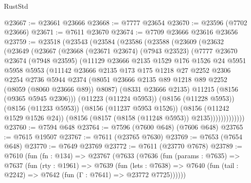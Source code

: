 \begin{lexlean}{RustStd}
\begin{coremodule}
@23667 := @23661 @23666
@23668 := @7777 @23654
@23670 := @23596 (@7702 @23666)
@23671 := @7611 @23670
@23674 := @7709 @23666 @23616 @23656
@23759 := @23518
    (@23543
      (@23584
        (@23586
          (@23588
            (@23609
              (@23632
                (@23649
                  (@23667
                    (@23668
                      (@23671 @23674)
                      (@7943 @23523)
                      (@7777
                        @23670
                        @23674
                        (@7948 @23595)
                        (@11129
                          @23666
                          @2135
                          @1529
                          @176
                          @1526
                          @24
                          @5951
                          @5958
                          @5953
                          (@11142
                            @23666
                            @2135
                            @173
                            @175
                            @1218
                            @27
                            @2252
                            @2306
                            @2254
                            @2736
                            @5944
                            @2374
                            (@8051
                              @23666
                              @2135
                              @89
                              @1218
                              @89
                              @2252
                              (@8059 (@8060 @23666 @89))
                              @8087)
                            (@8331 @23666 @2135)
                            @11215
                            (@8156 (@9365 @5945 @2306)))
                          (@11223 (@11224 @5953))
                          (@8156 (@11228 @5953))
                          (@8156 (@11233 @5953))
                          (@8156 (@11237 @5953 @1526))
                          (@8156 (@11242 @1529 @1526 @24))
                          (@8156 (@8157 (@8158 (@11248 @5953)) @2135)))))))))))))
@23760 := @7594 @648
@23764 := @7596 (@7600 @648) (@7606 @648)
@23765 := @7615 @19507
@23767 := @7611 (@23765 @7630)
@23769 := @7653 (@7654 @648)
@23770 := @7649 @23769
@23772 := @7611 (@23770 @7678)
@23789 := @7610
    (fun (fn : @134) =>
    @23767
      (@7633
        (@7636
          (fun (params : @7635) =>
          @7637
            (fun (rty : @1961) =>
            @7639
              (fun (lets : @7638) =>
              @7640 (fun (tail : @2242) => @7642 (fun (Γ : @7641) => @23772 @7725))))))

\end{coremodule}
\end{lexlean}
